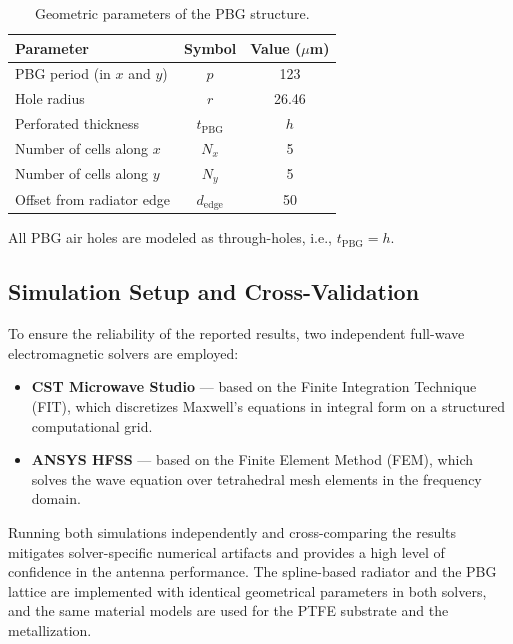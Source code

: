 \documentclass[draft]{agujournal2019}
\begin{document}
\begin{table}[ht]
\centering
\caption{Geometric parameters of the PBG structure.}
\label{tab:pbg_params}
\begin{tabular}{@{}lcc@{}}
\toprule
\textbf{Parameter} & \textbf{Symbol} & \textbf{Value ($\mu$m)} \\
\midrule
PBG period (in $x$ and $y$)      & $p$              & 123 \\
Hole radius                      & $r$              & 26.46  \\
Perforated thickness             & $t_{\mathrm{PBG}}$ & $h$ \\
Number of cells along $x$        & $N_x$            & 5   \\
Number of cells along $y$        & $N_y$            & 5   \\
Offset from radiator edge        & $d_{\mathrm{edge}}$ & 50 \\
\bottomrule
\end{tabular}
\end{table}

\smallskip\noindent
All PBG air holes are modeled as through-holes, i.e., $t_{\mathrm{PBG}} = h$.

\normalsize
\subsection{Simulation Setup and Cross-Validation}
\label{subsec:sim_setup}

To ensure the reliability of the reported results, two independent full-wave electromagnetic solvers are employed:

\begin{itemize}
  \item \textbf{CST Microwave Studio} --- based on the Finite Integration Technique (FIT), which discretizes Maxwell's equations in integral form on a structured computational grid.
  \item \textbf{ANSYS HFSS} --- based on the Finite Element Method (FEM), which solves the wave equation over tetrahedral mesh elements in the frequency domain.
\end{itemize}

Running both simulations independently and cross-comparing the results mitigates solver-specific numerical artifacts and provides a high level of confidence in the antenna performance. The spline-based radiator and the PBG lattice are implemented with identical geometrical parameters in both solvers, and the same material models are used for the PTFE substrate and the metallization.
\end{document}
